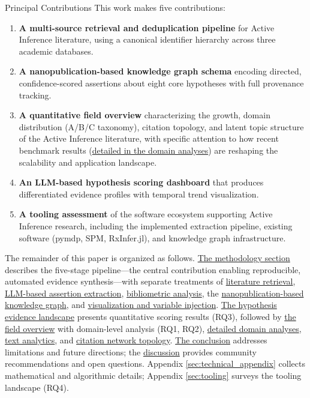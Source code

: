 \documentclass[
  ignorenonframetext,
]{beamer}
\begin{document}
\begin{frame}[allowframebreaks]{Principal Contributions}
\protect{}\label{principal-contributions}
This work makes five contributions:

\begin{enumerate}
\item
  \textbf{A multi-source retrieval and deduplication pipeline} for
  Active Inference literature, using a canonical identifier hierarchy
  across three academic databases.
\item
  \textbf{A nanopublication-based knowledge graph schema} encoding
  directed, confidence-scored assertions about eight core hypotheses
  with full provenance tracking.
\item
  \textbf{A quantitative field overview} characterizing the growth,
  domain distribution (A/B/C taxonomy), citation topology, and latent
  topic structure of the Active Inference literature, with specific
  attention to how recent benchmark results
  (\hyperref[sec:subfield_analyses]{detailed in the domain analyses})
  are reshaping the scalability and application landscape.
\item
  \textbf{An LLM-based hypothesis scoring dashboard} that produces
  differentiated evidence profiles with temporal trend visualization.
\item
  \textbf{A tooling assessment} of the software ecosystem supporting
  Active Inference research, including the implemented extraction
  pipeline, existing software (pymdp, SPM, RxInfer.jl), and knowledge
  graph infrastructure.
\end{enumerate}

The remainder of this paper is organized as follows.
\hyperref[sec:methods]{The methodology section} describes the five-stage
pipeline---the central contribution enabling reproducible, automated
evidence synthesis---with separate treatments of
\hyperref[sec:methods_retrieval]{literature retrieval},
\hyperref[sec:extraction_pipeline]{LLM-based assertion extraction},
\hyperref[sec:methods_bibliometrics]{bibliometric analysis}, the
\hyperref[sec:methods_kg]{nanopublication-based knowledge graph}, and
\hyperref[sec:methods_viz]{visualization and variable injection}.
\hyperref[sec:hypothesis_results]{The hypothesis evidence landscape}
presents quantitative scoring results (RQ3), followed by
\hyperref[sec:field_overview]{the field overview} with domain-level
analysis (RQ1, RQ2),
\hyperref[sec:subfield_analyses]{detailed domain analyses},
\hyperref[sec:text_analytics]{text analytics}, and
\hyperref[sec:citation_network]{citation network topology}.
\hyperref[sec:conclusion]{The conclusion} addresses limitations and
future directions; the \hyperref[sec:discussion]{discussion} provides
community recommendations and open questions. Appendix
\ref{sec:technical_appendix} collects mathematical and algorithmic
details; Appendix \ref{sec:tooling} surveys the tooling landscape (RQ4).
\end{frame}
\end{document}
